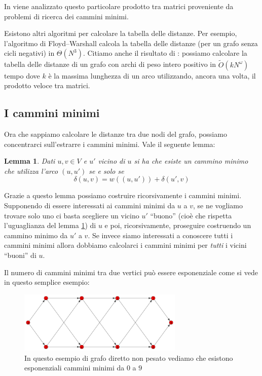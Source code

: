 \documentclass[a4paper,10pt]{amsbook}
\newcounter{counter1}
\theoremstyle{plain}
\newtheorem{mylem}[counter1]{Lemma}
\theoremstyle{definition}
\theoremstyle{remark}
\newcommand{\pa}[1]{\left(#1\right)}
\begin{document}
In \cite{funnymult} viene analizzato questo particolare prodotto tra
matrici proveniente da problemi di ricerca dei cammini minimi.


Esistono altri algoritmi per calcolare la tabella delle distanze. Per
esempio, l'algoritmo di Floyd–Warshall calcola la tabella delle
distanze (per un grafo senza cicli negativi) in $\Theta\pa{ N^3}$.
Citiamo anche il risultato di \cite{apspfmp}: possiamo calcolare la
tabella delle distanze di un grafo con archi di peso intero positivo
in $\tilde O\pa{ kN^\omega}$ tempo dove $k$ è la massima lunghezza di
un arco utilizzando, ancora una volta, il prodotto veloce tra matrici.

\subsection{I cammini minimi}

Ora che sappiamo calcolare le distanze tra due nodi del grafo,
possiamo concentrarci sull'estrarre i cammini minimi. Vale il seguente
lemma:
\begin{mylem}
  \label{lem:vicinibuoni}
  Dati $u,v \in V$ e $u'$ vicino di $u$ si ha che esiste un cammino
  minimo che utilizza l'arco $(u,u')$ se e solo se
  \[ \delta \pa{ u,v} = w\pa{ (u,u') } + \delta \pa{ u',v} \]
\end{mylem}

Grazie a questo lemma possiamo costruire ricorsivamente i cammini
minimi. Supponendo di essere interessati ai cammini minimi da $u$ a
$v$, se ne vogliamo trovare solo uno ci basta scegliere un vicino $u'$
``buono'' (cioè che rispetta l'uguaglianza del lemma
\ref{lem:vicinibuoni}) di $u$ e poi, ricorsivamente, proseguire
costruendo un cammino minimo da $u'$ a $v$. Se invece siamo
interessati a conoscere tutti i cammini minimi allora dobbiamo
calcolarci i cammini minimi per \emph{tutti} i vicini ``buoni'' di
$u$.

Il numero di cammini minimi tra due vertici può essere esponenziale
come si vede in questo semplice esempio:

\begin{figure}[H]
  \centering
  \includegraphics[width=0.7\textwidth]{diamante}
  \caption{In questo esempio di grafo diretto non pesato vediamo che
    esistono esponenziali cammini minimi da $0$ a $9$}
  \label{fig:diamante}
\end{figure}
\end{document}
